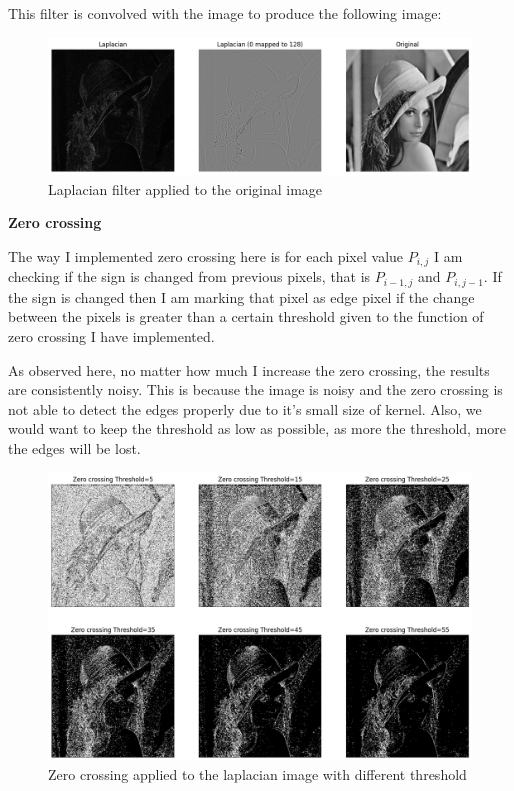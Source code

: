 This filter is convolved with the image to produce the following image:

\begin{figure}[H]
    \centering
    \includegraphics[width=1.06\textwidth]{res/3b_laplacian.png}
    \caption{Laplacian filter applied to the original image}
    \label{fig:3b_laplacian}
\end{figure}

\textbf{Zero crossing}

The way I implemented zero crossing here is for each pixel value $P_{i,j}$ I am checking if the sign is changed from previous pixels, that is $P_{i-1,j}$ and $P_{i,j-1}$. If the sign is changed then I am marking that pixel as edge pixel if the change between the pixels is greater than a certain threshold given to the function of zero crossing I have implemented.

As observed here, no matter how much I increase the zero crossing, the results are consistently noisy. This is because the image is noisy and the zero crossing is not able to detect the edges properly due to it's small size of kernel. Also, we would want to keep the threshold as low as possible, as more the threshold, more the edges will be lost.

\begin{figure}[H]
    \centering
    \includegraphics[width=1.06\textwidth]{res/3b_zero_crossing.png}
    \caption{Zero crossing applied to the laplacian image with different threshold}
    \label{fig:3b_zero_crossing}
\end{figure}

